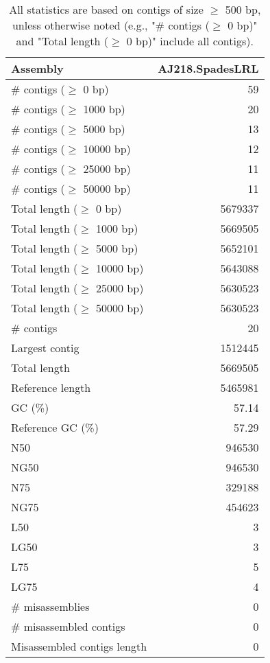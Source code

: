 \documentclass[12pt,a4paper]{article}
\begin{document}
\begin{table}[ht]
\begin{center}
\caption{All statistics are based on contigs of size $\geq$ 500 bp, unless otherwise noted (e.g., "\# contigs ($\geq$ 0 bp)" and "Total length ($\geq$ 0 bp)" include all contigs).}
\begin{tabular}{|l*{1}{|r}|}
\hline
Assembly & AJ218.SpadesLRL \\ \hline
\# contigs ($\geq$ 0 bp) & 59 \\ \hline
\# contigs ($\geq$ 1000 bp) & 20 \\ \hline
\# contigs ($\geq$ 5000 bp) & 13 \\ \hline
\# contigs ($\geq$ 10000 bp) & 12 \\ \hline
\# contigs ($\geq$ 25000 bp) & 11 \\ \hline
\# contigs ($\geq$ 50000 bp) & 11 \\ \hline
Total length ($\geq$ 0 bp) & 5679337 \\ \hline
Total length ($\geq$ 1000 bp) & 5669505 \\ \hline
Total length ($\geq$ 5000 bp) & 5652101 \\ \hline
Total length ($\geq$ 10000 bp) & 5643088 \\ \hline
Total length ($\geq$ 25000 bp) & 5630523 \\ \hline
Total length ($\geq$ 50000 bp) & 5630523 \\ \hline
\# contigs & 20 \\ \hline
Largest contig & 1512445 \\ \hline
Total length & 5669505 \\ \hline
Reference length & 5465981 \\ \hline
GC (\%) & 57.14 \\ \hline
Reference GC (\%) & 57.29 \\ \hline
N50 & 946530 \\ \hline
NG50 & 946530 \\ \hline
N75 & 329188 \\ \hline
NG75 & 454623 \\ \hline
L50 & 3 \\ \hline
LG50 & 3 \\ \hline
L75 & 5 \\ \hline
LG75 & 4 \\ \hline
\# misassemblies & 0 \\ \hline
\# misassembled contigs & 0 \\ \hline
Misassembled contigs length & 0 \\ \hline

\end{tabular}
\end{center}
\end{table}
\end{document}
